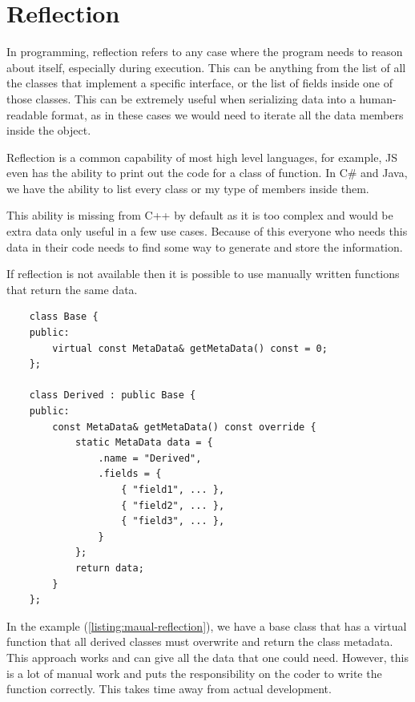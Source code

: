 \chapter{Reflection}\label{ch:reflection}

In programming, reflection refers to any case where the program needs to reason about itself, especially during execution.
This can be anything from the list of all the classes that implement a specific interface, or the list of fields inside one of those classes.
This can be extremely useful when serializing data into a human-readable format, as in these cases we would need to iterate all the data members inside the object.

Reflection is a common capability of most high level languages, for example, JS even has the ability to print out the code for a class of function.
In C\# and Java, we have the ability to list every class or my type of members inside them.

This ability is missing from C++ by default as it is too complex and would be extra data only useful in a few use cases.
Because of this everyone who needs this data in their code needs to find some way to generate and store the information.

If reflection is not available then it is possible to use manually written functions that return the same data.

\begin{listing}[!ht]
    \begin{verbatim}
    class Base {
    public:
        virtual const MetaData& getMetaData() const = 0;
    };

    class Derived : public Base {
    public:
        const MetaData& getMetaData() const override {
            static MetaData data = {
                .name = "Derived",
                .fields = {
                    { "field1", ... },
                    { "field2", ... },
                    { "field3", ... },
                }
            };
            return data;
        }
    };
    \end{verbatim}
    \caption{Example for a manual reflection function}
    \label{listing:maual-reflection}
\end{listing}

In the example (\ref{listing:maual-reflection}), we have a base class that has a virtual function that all derived classes must overwrite and return the class metadata.
This approach works and can give all the data that one could need.
However, this is a lot of manual work and puts the responsibility on the coder to write the function correctly.
This takes time away from actual development.

